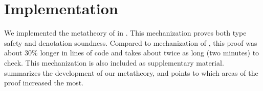 \section{Implementation}

We implemented the metatheory of \sysrfd in \coq.
This mechanization 
proves both type safety and
denotation soundness. 
%
Compared to mechanization of \sysrf, this proof
was about $30\%$ longer in lines of code and takes
about twice as long (two minutes) to check.
%
This mechanization is also included as supplementary
material.
%
 summarizes the development 
of our metatheory, and points to which areas of the 
proof increased the most. 


\begin{comment}
\chapter{Soundness of \sysrf} 
\label{ch:soundness}







\section{Type Safety}
\label{sec:soundness:safety}

The type safety theorem  states that a well-typed 
term does not get stuck: \ie either 
evaluates to a value or can step 
to another term (progress) 
of the same type (preservation).
%

\begin{theorem} (Type Safety of \sysrf) 
\label{lem:soundness} 
\begin{enumerate}
    \item (Type Safety)
    If $\hastype{\varnothing}{\sexpr}{\stype}$ and $\evalsTo{\sexpr}{\sexpr'}$,
    then $\sexpr'$ is a value or $\sexpr' \step \sexpr''$
    for some $\sexpr''$.
    \item (No Error)
    If $\hastype{\varnothing}{\sexpr}{\stype}$ and $\evalsTo{\sexpr}{\sexpr'}$,
    then $\sexpr' \not = \eerr$.
\end{enumerate}
\end{theorem}
The No Error property explicitly states that well-typed terms 
cannot evaluate to the term $\eerr$ (that encodes stuck terms)
and is a direct implication of type safety.
We prove type safety by induction on the 
length of the sequence of steps  
$\evalsTo{\sexpr}{\sexpr'}$, using  
preservation and progress.


\end{comment}
